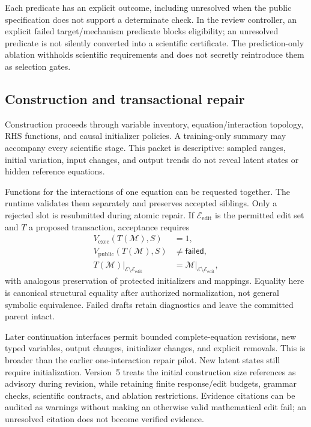 \documentclass[11pt]{article}
\newcommand{\M}{\mathcal{M}}
\begin{document}
Each predicate has an explicit outcome, including unresolved when the public
specification does not support a determinate check. In the review controller,
an explicit failed target/mechanism predicate blocks eligibility; an unresolved
predicate is not silently converted into a scientific certificate. The
prediction-only ablation withholds scientific requirements and does not secretly
reintroduce them as selection gates.

\subsection{Construction and transactional repair}
Construction proceeds through variable inventory, equation/interaction topology,
RHS functions, and causal initializer policies. A training-only summary may
accompany every scientific stage. This packet is descriptive: sampled ranges,
initial variation, input changes, and output trends do not reveal latent states
or hidden reference equations.

Functions for the interactions of one equation can be requested together.
The runtime validates them separately and preserves accepted siblings. Only a
rejected slot is resubmitted during atomic repair. If $\mathcal E_{\mathrm{edit}}$
is the permitted edit set and $T$ a proposed transaction, acceptance requires
\begin{align}
 V_{\mathrm{exec}}(T(\M),S)&=1,\\
 V_{\mathrm{public}}(T(\M),S)&\ne\mathsf{failed},\\
 T(\M)|_{\mathcal E\setminus\mathcal E_{\mathrm{edit}}}
   &=\M|_{\mathcal E\setminus\mathcal E_{\mathrm{edit}}},
 \label{eq:transaction}
\end{align}
with analogous preservation of protected initializers and mappings. Equality
here is canonical structural equality after authorized normalization, not general
symbolic equivalence. Failed drafts retain diagnostics and leave the committed
parent intact.

Later continuation interfaces permit bounded complete-equation revisions,
new typed variables, output changes, initializer changes, and explicit removals.
This is broader than the earlier one-interaction repair pilot. New latent states
still require initialization. Version~5 treats the initial construction size
references as advisory during revision, while retaining finite response/edit
budgets, grammar checks, scientific contracts, and ablation restrictions.
Evidence citations can be audited as warnings without making an otherwise valid
mathematical edit fail; an unresolved citation does not become verified evidence.
\end{document}
